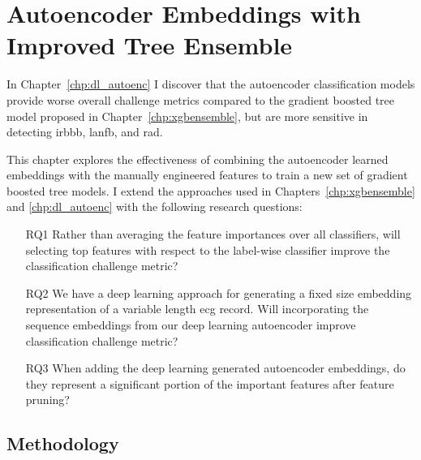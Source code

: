 \documentclass[\main/thesis.tex]{subfiles}
\begin{document}
\chapter{Autoencoder Embeddings with Improved Tree Ensemble}
\label{chp:aencxgb}

In Chapter~\ref{chp:dl_autoenc} I discover that the autoencoder classification models provide worse overall challenge metrics compared to the gradient boosted tree model proposed in Chapter~\ref{chp:xgbensemble}, but are more sensitive in detecting \gls{irbbb}, \gls{lanfb}, and \gls{rad}.

This chapter explores the effectiveness of combining the autoencoder learned embeddings with the manually engineered features to train a new set of gradient boosted tree models.
I extend the approaches used in Chapters~\ref{chp:xgbensemble} and \ref{chp:dl_autoenc} with the following research questions:
\begin{enumerate}
    \item[RQ1] \label{question:xgb_aenc_one} Rather than averaging the feature importances over all classifiers, will selecting top features with respect to the label-wise classifier improve the classification challenge metric?
    \item[RQ2] We have a deep learning approach for generating a fixed size embedding representation of a variable length \gls{ecg} record. Will incorporating the sequence embeddings from our deep learning autoencoder improve classification challenge metric?
    \item[RQ3] When adding the deep learning generated autoencoder embeddings, do they represent a significant portion of the important features after feature pruning?
\end{enumerate}

\section{Methodology}
\end{document}
